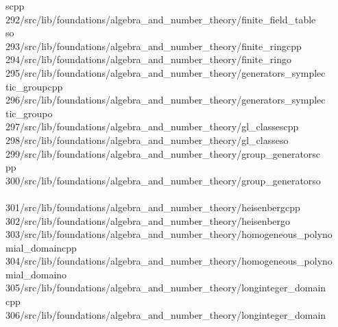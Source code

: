 \begin{tabbing}
\>scpp\\[0pt]
292\>/src/lib/foundations/algebra\_and\_number\_theory/finite\_field\_table\\[0pt]
\>so\\[0pt]
293\>/src/lib/foundations/algebra\_and\_number\_theory/finite\_ringcpp\\[0pt]
294\>/src/lib/foundations/algebra\_and\_number\_theory/finite\_ringo\\[0pt]
295\>/src/lib/foundations/algebra\_and\_number\_theory/generators\_symplec\\[0pt]
\>tic\_groupcpp\\[0pt]
296\>/src/lib/foundations/algebra\_and\_number\_theory/generators\_symplec\\[0pt]
\>tic\_groupo\\[0pt]
297\>/src/lib/foundations/algebra\_and\_number\_theory/gl\_classescpp\\[0pt]
298\>/src/lib/foundations/algebra\_and\_number\_theory/gl\_classeso\\[0pt]
299\>/src/lib/foundations/algebra\_and\_number\_theory/group\_generatorsc\\[0pt]
\>pp\\[0pt]
300\>/src/lib/foundations/algebra\_and\_number\_theory/group\_generatorso\\[0pt]
\>\\[0pt]
301\>/src/lib/foundations/algebra\_and\_number\_theory/heisenbergcpp\\[0pt]
302\>/src/lib/foundations/algebra\_and\_number\_theory/heisenbergo\\[0pt]
303\>/src/lib/foundations/algebra\_and\_number\_theory/homogeneous\_polyno\\[0pt]
\>mial\_domaincpp\\[0pt]
304\>/src/lib/foundations/algebra\_and\_number\_theory/homogeneous\_polyno\\[0pt]
\>mial\_domaino\\[0pt]
305\>/src/lib/foundations/algebra\_and\_number\_theory/longinteger\_domain\\[0pt]
\>cpp\\[0pt]
306\>/src/lib/foundations/algebra\_and\_number\_theory/longinteger\_domain\\[0pt]

\end{tabbing}
